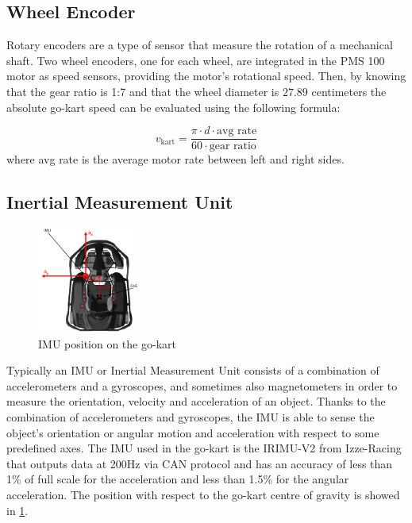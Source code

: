 \documentclass[a4paper,12pt,oneside]{book}
\begin{document}
\subsection*{Wheel Encoder}
Rotary encoders are a type of sensor that measure the rotation of a mechanical shaft.
Two wheel encoders, one for each wheel, are integrated in the PMS 100 motor as speed sensors, providing the motor's rotational speed.
Then, by knowing that the gear ratio is 1:7 and that the wheel diameter is $27.89$ centimeters the absolute go-kart speed can be evaluated using the following formula:

\begin{equation}
    v_{\text{kart}} = \frac{\pi \cdot d \cdot \text{avg rate}}{60 \cdot \text{gear ratio}}
\end{equation}
where avg rate is the average motor rate between left and right sides.



\subsection*{Inertial Measurement Unit}

\begin{figure}[h!]
	\centering
	\includegraphics[width=0.3\textwidth]{IMU.png}
\caption{IMU position on the go-kart}
\label{IMU_pose}
\end{figure}

Typically an IMU or Inertial Measurement Unit consists of a combination of accelerometers and a gyroscopes, and sometimes also magnetometers in order to measure the orientation, velocity and acceleration of an object.
Thanks to the combination of accelerometers and gyroscopes, the IMU is able to sense the object's orientation or angular motion and acceleration with respect to some predefined axes.
The IMU used in the go-kart is the IRIMU-V2 from Izze-Racing that outputs data at 200Hz via CAN protocol and has an accuracy of less than 1\% of full scale for the acceleration and less than 1.5\% for the angular acceleration.
The position with respect to the go-kart centre of gravity is showed in \ref{IMU_pose}.
\end{document}
